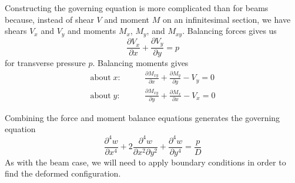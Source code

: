 Constructing the governing equation is more complicated than for beams because, instead of shear $V$ and moment $M$ on an infinitesimal section, we have shears $V_x$ and $V_y$ and moments $M_x$, $M_y$, and $M_{xy}$.
Balancing forces gives us
\begin{equation}
\frac{\partial V_x}{\partial x}+\frac{\partial V_y}{\partial y} = p
\end{equation}
for transverse pressure $p$.
Balancing moments gives
\begin{align}
\text{about} \;x:\qquad& \frac{\partial M_{xy}}{\partial x}+\frac{\partial M_{y}}{\partial y} - V_y = 0\\
\text{about} \;y:\qquad& \frac{\partial M_{xy}}{\partial y}+\frac{\partial M_{x}}{\partial x} - V_x = 0
\end{align}

Combining the force and moment balance equations generates the governing equation
\begin{equation}
\frac{\partial^4w}{\partial x^4}+2\frac{\partial^4w}{\partial x^2 \partial y^2}+\frac{\partial^4w}{\partial y^4}=\frac{p}{D}
\end{equation}
As with the beam case, we will need to apply boundary conditions in order to find the deformed configuration.
